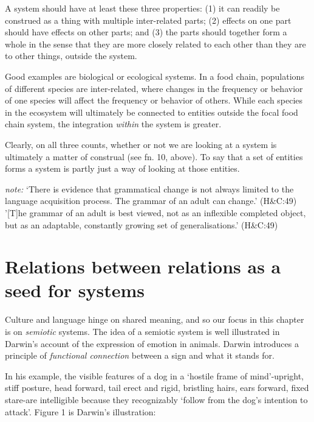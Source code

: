 A system should have at least these three properties: (1) it can readily 
be construed as a thing with multiple inter-related parts; (2) effects 
on one part should have effects on other parts; and (3) the parts should 
together form a whole in the sense that they are more closely related to 
each other than they are to other things, outside the system. 



Good examples are biological or ecological systems. In a food chain, 
populations of different species are inter-related, where changes in the 
frequency or behavior of one species will affect the frequency or 
behavior of others. While each species in the ecosystem will ultimately 
be connected to entities outside the focal food chain system, the 
integration \textit{within }the system is greater. 



Clearly, on all three counts, whether or not we are looking at a system 
is ultimately a matter of construal (see fn. 10, above). To say that a 
set of entities forms a system is partly just a way of looking at those 
entities. 


\textit{note:} \textquoteleft There is evidence that grammatical change is not always limited to the language acquisition process. The grammar of an adult can change.' (H\&C:49)
'[T]he grammar of an adult is best viewed, not as an inflexible completed object, but as an adaptable, constantly growing set of generalisations.' (H\&C:49)


\section{Relations between relations as a seed for systems}


Culture and language hinge on shared meaning, and so our focus in this 
chapter is on \textit{semiotic }systems. The idea of a semiotic system 
is well illustrated in Darwin's account of the expression of emotion in 
animals. Darwin introduces a principle of \textit{functional connection 
}between a sign and what it stands for. 



In his example, the visible features of a dog in a \textquoteleft hostile frame of 
mind'-upright, stiff posture, head forward, tail erect and rigid, 
bristling hairs, ears forward, fixed stare-are intelligible because they 
recognizably \textquoteleft follow from the dog's intention to attack'. Figure 1 is 
Darwin's illustration:


